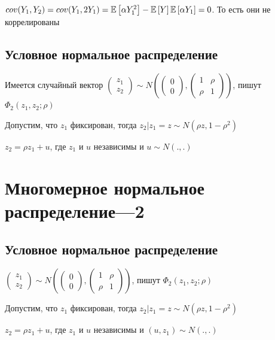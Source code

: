 \documentclass[a4paper, 10pt]{article}
\begin{document}
$cov(Y_1,Y_2)=cov(Y_1,2Y_1)=\mathbb{E}\left[\alpha Y_1^2\right]-\mathbb{E}\left[Y\right]\mathbb{E}\left[\alpha Y_1\right]=0$. То есть они не коррелированы


\subsection{Условное нормальное распределение}
Имеется случайный вектор $\begin{pmatrix}
    z_1\\
    z_2
\end{pmatrix}\sim N\left(\begin{pmatrix}
    0\\
    0
\end{pmatrix},\begin{pmatrix}
    1&\rho\\
    \rho&1
\end{pmatrix}\right)$, пишут $\Phi_2(z_1,z_2;\rho)$

Допустим, что $z_1$ фиксирован, тогда $z_2|z_1=z\sim N(\rho z,1-\rho^2)$

$z_2=\rho z_1+u$, где $z_1$ и $u$ независимы и $u\sim N(.,.)$

\newpage
\section{Многомерное нормальное распределение—2}
\subsection{Условное нормальное распределение}
    $\begin{pmatrix}
        z_1\\
        z_2
    \end{pmatrix}\sim N\left(\begin{pmatrix}
        0\\
        0
    \end{pmatrix},\begin{pmatrix}
        1&\rho\\
        \rho&1
    \end{pmatrix}\right)$, пишут $\Phi_2(z_1,z_2;\rho)$
    
    Допустим, что $z_1$ фиксирован, тогда $z_2|z_1=z\sim N(\rho z,1-\rho^2)$

    \state $z_2=\rho z_1+u$, где $z_1$ и $u$ независимы и $(u,z_1)\sim N(.,.)$
\end{document}
